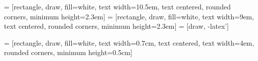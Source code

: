 

 =
[rectangle, draw, fill=white, text width=10.5em, text centered, rounded
corners, minimum height=2.3em]
 =
[rectangle, draw, fill=white, text width=9em, text centered, rounded
corners, minimum height=2.3em]  = [draw, -latex']


 = [rectangle, draw, fill=white, text width=0.7cm, text
centered,  text width=4em, rounded corners, minimum height=0.5cm]



%





%
%